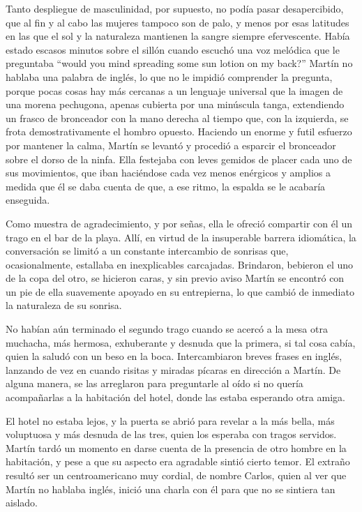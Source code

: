 \documentclass[11pt,twoside,openright,a6paper]{book}
\begin{document}
Tanto despliegue de masculinidad, por supuesto, no podía pasar desapercibido,
que al fin y al cabo las mujeres tampoco son de palo, y menos por esas
latitudes en las que el sol y la naturaleza mantienen la sangre siempre
efervescente. Había estado escasos minutos sobre el sillón cuando escuchó
una voz melódica que le preguntaba “would you mind spreading some sun
lotion on my back?” Martín no hablaba una palabra de inglés, lo que no
le impidió comprender la pregunta, porque pocas cosas hay más cercanas a
un lenguaje universal que la imagen de una morena pechugona, apenas cubierta
por una minúscula tanga, extendiendo un frasco de bronceador con la mano
derecha al tiempo que, con la izquierda, se frota demostrativamente el
hombro opuesto. Haciendo un enorme y futil esfuerzo por mantener la calma,
Martín se levantó y procedió a esparcir el bronceador sobre el dorso de la
ninfa. Ella festejaba con leves gemidos de placer cada uno de sus movimientos,
que iban haciéndose cada vez menos enérgicos y amplios a medida que él
se daba cuenta de que, a ese ritmo, la espalda se le acabaría enseguida.

Como muestra de agradecimiento, y por señas, ella le ofreció
compartir con él un trago en el bar de la playa. Allí, en virtud de la
insuperable barrera idiomática, la conversación se limitó a un constante
intercambio de sonrisas que, ocasionalmente, estallaba en inexplicables
carcajadas. Brindaron, bebieron el uno de la copa del otro, se hicieron caras,
y sin previo aviso Martín se encontró con un pie de ella suavemente apoyado
en su entrepierna, lo que cambió de inmediato la naturaleza de su sonrisa.

No habían aún terminado el segundo trago cuando se acercó a la mesa
otra muchacha, más hermosa, exhuberante y desnuda que la primera, si tal
cosa cabía, quien la saludó con un beso en la boca. Intercambiaron breves
frases en inglés, lanzando de vez en cuando risitas y miradas pícaras en
dirección a Martín. De alguna manera, se las arreglaron para preguntarle
al oído si no quería acompañarlas a la habitación del hotel, donde las
estaba esperando otra amiga.

El hotel no estaba lejos, y la puerta se abrió para revelar a la más bella,
más voluptuosa y más desnuda de las tres, quien los esperaba con tragos
servidos. Martín tardó un momento en darse cuenta de la presencia de otro
hombre en la habitación, y pese a que su aspecto era agradable sintió
cierto temor. El extraño resultó ser un centroamericano muy cordial,
de nombre Carlos, quien al ver que Martín no hablaba inglés, inició una
charla con él para que no se sintiera tan aislado.
\end{document}

